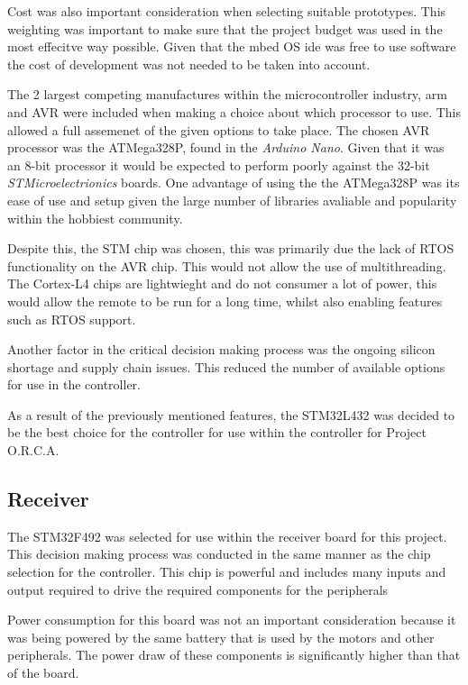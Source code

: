 \documentclass [11pt]{article}
\begin{document}
Cost was also important consideration when selecting suitable prototypes. This weighting was important to make sure that the project budget was used in the most effecitve way possible. Given that the \gls{mbed} OS \gls{ide} was free to use software the cost of development was not needed to be taken into account. 

The 2 largest competing manufactures within the microcontroller industry, \gls{arm} and AVR were included when making a choice about which processor to use. This allowed a full assemenet of the given options to take place. The chosen AVR processor was the ATMega328P, found in the \textit{Arduino Nano}. Given that it was an 8-bit processor it would be expected to perform poorly against the 32-bit \textit{STMicroelectrionics} boards. One advantage of using the the ATMega328P was its ease of use and setup given the large number of libraries avaliable and popularity within the hobbiest community. 

Despite this, the STM chip was chosen, this was primarily due the lack of RTOS functionality on the AVR chip. This would not allow the use of multithreading. The Cortex-L4 chips are lightwieght and do not consumer a lot of power, this would allow the remote to be run for a long time, whilst also enabling features such as RTOS support. 

Another factor in the critical decision making process was the ongoing silicon shortage and supply chain issues. This reduced the number of available options for use in the controller.  

As a result of the previously mentioned features, the STM32L432 was decided to be the best choice for the controller for use within the controller for Project O.R.C.A.    

\subsection{Receiver}

The STM32F492 was selected for use within the receiver board for this project. This decision making process was conducted in the same manner as the chip selection for the controller. This chip is powerful and includes many inputs and output required to drive the required components for the peripherals \cite{stmf429zi}

Power consumption for this board was not an important consideration because it was being powered by the same battery that is used by the motors and other peripherals. The power draw of these components is significantly higher than that of the board.
\end{document}
